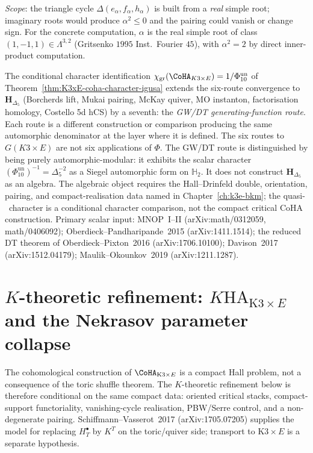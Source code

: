 \begin{proposition}[\texorpdfstring{$\chi_3 \neq 0$}{chi-3 != 0} via triangle-cycle pairing]
\emph{Scope}: the triangle cycle $\Delta(e_\alpha, f_\alpha,
h_\alpha)$ is built from a \emph{real} simple root; imaginary roots
would produce $\alpha^2 \leq 0$ and the pairing could vanish or
change sign. For the concrete computation, $\alpha$ is the real
simple root of class $(1, -1, 1)\in \Lambda^{3,2}$ (Gritsenko
$1995$ Inst.\ Fourier $45$), with $\alpha^2 = 2$ by direct
inner-product computation.
\end{proposition}

\begin{remark}
\label{rem:tcy3-k3xe-three-constructions}
The conditional character identification
$\chi_{\mathrm{gr}}(\CoHA_{K3 \times E}) = 1/\Phi_{10}^{\mathrm{un}}$ of
Theorem~\ref{thm:K3xE-coha-character-igusa} extends the six-route
convergence to $\mathbf{H}_{\Delta_5}$ (Borcherds lift, Mukai pairing,
McKay quiver, MO instanton, factorisation homology, Costello 5d hCS)
by a seventh: the \emph{GW/DT generating-function route}. Each route
is a different construction or comparison producing the same
automorphic denominator at the layer where it is defined. The six
routes to $G(K3 \times E)$ are not six applications of $\Phi$.
The GW/DT route is distinguished by being purely
automorphic-modular: it exhibits the scalar character
\((\Phi_{10}^{\mathrm{un}})^{-1}=\Delta_5^{-2}\) as a Siegel automorphic form on
$\mathbb{H}_2$. It does not construct $\mathbf{H}_{\Delta_5}$ as an
algebra. The algebraic object requires the Hall--Drinfeld double,
orientation, pairing, and compact-realisation data named in
Chapter~\ref{ch:k3e-bkm}; the quasi-\NCCR\ character is a conditional
character comparison, not the compact critical CoHA construction.
Primary scalar input: MNOP~I--II (arXiv:math/0312059, math/0406092);
Oberdieck--Pandharipande~2015 (arXiv:1411.1514); the reduced
DT theorem of Oberdieck--Pixton~2016 (arXiv:1706.10100);
Davison~2017 (arXiv:1512.04179); Maulik--Okounkov~2019
(arXiv:1211.1287).
\end{remark}

\section{\texorpdfstring{$K$}{K}-theoretic refinement: \texorpdfstring{$K\mathrm{HA}_{\mathrm{K3}\times E}$}{KHA-K3x E}
and the Nekrasov parameter collapse}
\label{sec:tcy3-k-theoretic-coha}

The cohomological construction of $\CoHA_{\mathrm{K3}\times E}$ is a
compact Hall problem, not a consequence of the toric shuffle theorem.
The $K$-theoretic refinement below is therefore conditional on the same
compact data: oriented critical stacks, compact-support functoriality,
vanishing-cycle realisation, PBW/Serre control, and a non-degenerate
pairing. Schiffmann--Vasserot~2017 (arXiv:1705.07205) supplies the
model for replacing $H^\bullet_T$ by $K^T$ on the toric/quiver side;
transport to $\mathrm{K3}\times E$ is a separate hypothesis.

